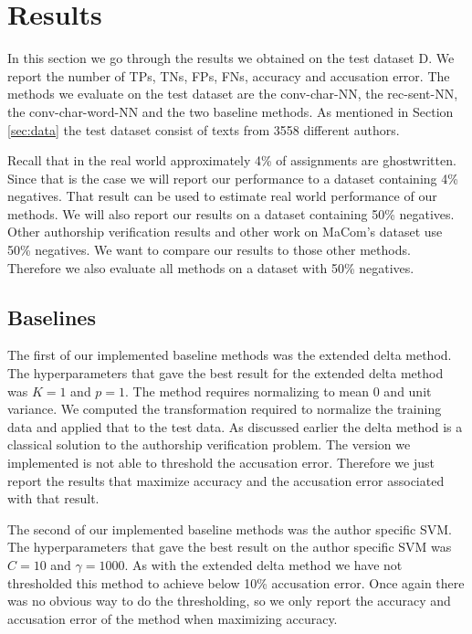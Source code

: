 \section{Results} \label{sec:results}

In this section we go through the results we obtained on the test dataset
\gls{D}. We report the number of \glspl{TP}, \glspl{TN}, \glspl{FP}, \glspl{FN},
accuracy and accusation error. The methods we evaluate on the test dataset are
the \gls{conv-char-NN}, the \gls{rec-sent-NN}, the \gls{conv-char-word-NN}
and the two baseline methods. As mentioned in Section \ref{sec:data} the test
dataset consist of texts from 3558 different authors.

Recall that in the real world approximately 4\% of assignments are ghostwritten.
Since that is the case we will report our performance to a dataset containing
4\% negatives. That result can be used to estimate real world performance of our
methods. We will also report our results on a dataset containing 50\% negatives.
Other authorship verification results and other work on MaCom's dataset use 50\%
negatives. We want to compare our results to those other methods. Therefore we
also evaluate all methods on a dataset with 50\% negatives.


\subsection{Baselines}

The first of our implemented baseline methods was the extended delta method.
The hyperparameters that gave the best result for the extended delta method
was $K = 1$ and $p = 1$. The method requires normalizing to mean 0 and unit
variance. We computed the transformation required to normalize the training
data and applied that to the test data. As discussed earlier the delta method
is a classical solution to the authorship verification problem. The version we
implemented is not able to threshold the accusation error. Therefore we just
report the results that maximize accuracy and the accusation error associated
with that result.

The second of our implemented baseline methods was the author specific
\gls{SVM}. The hyperparameters that gave the best result on the author specific
\gls{SVM} was $C = 10$ and $\gamma = 1000$. As with the extended delta method we
have not thresholded this method to achieve below 10\% accusation error. Once
again there was no obvious way to do the thresholding, so we only report the
accuracy and accusation error of the method when maximizing accuracy.


